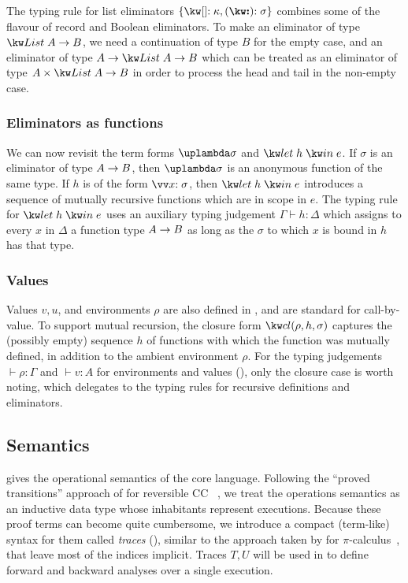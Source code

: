 The typing rule for list eliminators $\elimList{\kappa}{\sigma}$ combines some of the flavour of record and Boolean eliminators. To make an eliminator of type $\tyFun{\tyList{A}}{B}$, we need a continuation of type $B$ for the empty case, and an eliminator of type $\tyFun{A}{\tyFun{\tyList{A}}{B}}$ which can be treated as an eliminator of type $\tyFun{\tyProd{A}{\tyList{A}}}{B}$ in order to process the head and tail in the non-empty case.

\subsubsection{Eliminators as functions}

We can now revisit the term forms $\exLambda{\sigma}$ and $\exLetRecMutual{h}{e}$. If $\sigma$ is an eliminator of type ${A}\rightarrow{B}$, then $\exLambda{\sigma}$ is an anonymous function of the same type. If $h$ is of the form $\vec{\bind{x}{\sigma}}$, then $\exLetRecMutual{h}{e}$ introduces a sequence of mutually recursive functions which are in scope in $e$. The typing rule for $\exLetRecMutual{h}{e}$ uses an auxiliary typing judgement $\Gamma \vdash h : \Delta$ which assigns to every $x$ in $\Delta$ a function type ${A}\rightarrow{B}$ as long as the $\sigma$ to which $x$ is bound in $h$ has that type.

\subsubsection{Values}
Values $v, u$, and environments $\rho$ are also defined in , and are standard for call-by-value. To support mutual recursion, the closure form $\exClosure{\rho}{h}{\sigma}$ captures the (possibly empty) sequence $h$ of functions with which the function was mutually defined, in addition to the ambient environment $\rho$. For the typing judgements $\vdash \rho: \Gamma$ and $\vdash v: A$ for environments and values (), only the closure case is worth noting, which delegates to the typing rules for recursive definitions and eliminators.

\subsection{Semantics}

 gives the operational semantics of the core language. Following the ``proved transitions'' approach of \citeauthor{boudol89} for reversible CC~ \cite{boudol89}, we treat the operations semantics as an inductive data type whose inhabitants represent executions. Because these proof terms can become quite cumbersome, we introduce a compact (term-like) syntax for them called \emph{traces} (), similar to the approach taken by \citeauthor{perera16d} for $\pi$-calculus~\cite{perera16d}, that leave most of the indices implicit. Traces $T, U$ will be used in  to define forward and backward analyses over a single execution.

